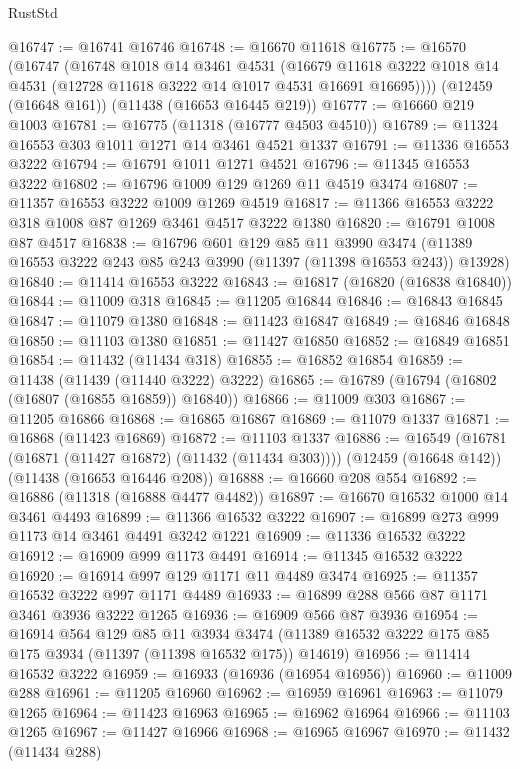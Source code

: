 \begin{lexlean}{RustStd}
\begin{coremodule}
@16747 := @16741 @16746
@16748 := @16670 @11618
@16775 := @16570
    (@16747
      (@16748
        @1018
        @14
        @3461
        @4531
        (@16679 @11618 @3222 @1018 @14 @4531 (@12728 @11618 @3222 @14 @1017 @4531 @16691 @16695))))
    (@12459 (@16648 @161))
    (@11438 (@16653 @16445 @219))
@16777 := @16660 @219 @1003
@16781 := @16775 (@11318 (@16777 @4503 @4510))
@16789 := @11324 @16553 @303 @1011 @1271 @14 @3461 @4521 @1337
@16791 := @11336 @16553 @3222
@16794 := @16791 @1011 @1271 @4521
@16796 := @11345 @16553 @3222
@16802 := @16796 @1009 @129 @1269 @11 @4519 @3474
@16807 := @11357 @16553 @3222 @1009 @1269 @4519
@16817 := @11366 @16553 @3222 @318 @1008 @87 @1269 @3461 @4517 @3222 @1380
@16820 := @16791 @1008 @87 @4517
@16838 := @16796
    @601
    @129
    @85
    @11
    @3990
    @3474
    (@11389 @16553 @3222 @243 @85 @243 @3990 (@11397 (@11398 @16553 @243)) @13928)
@16840 := @11414 @16553 @3222
@16843 := @16817 (@16820 (@16838 @16840))
@16844 := @11009 @318
@16845 := @11205 @16844
@16846 := @16843 @16845
@16847 := @11079 @1380
@16848 := @11423 @16847
@16849 := @16846 @16848
@16850 := @11103 @1380
@16851 := @11427 @16850
@16852 := @16849 @16851
@16854 := @11432 (@11434 @318)
@16855 := @16852 @16854
@16859 := @11438 (@11439 (@11440 @3222) @3222)
@16865 := @16789 (@16794 (@16802 (@16807 (@16855 @16859)) @16840))
@16866 := @11009 @303
@16867 := @11205 @16866
@16868 := @16865 @16867
@16869 := @11079 @1337
@16871 := @16868 (@11423 @16869)
@16872 := @11103 @1337
@16886 := @16549
    (@16781 (@16871 (@11427 @16872) (@11432 (@11434 @303))))
    (@12459 (@16648 @142))
    (@11438 (@16653 @16446 @208))
@16888 := @16660 @208 @554
@16892 := @16886 (@11318 (@16888 @4477 @4482))
@16897 := @16670 @16532 @1000 @14 @3461 @4493
@16899 := @11366 @16532 @3222
@16907 := @16899 @273 @999 @1173 @14 @3461 @4491 @3242 @1221
@16909 := @11336 @16532 @3222
@16912 := @16909 @999 @1173 @4491
@16914 := @11345 @16532 @3222
@16920 := @16914 @997 @129 @1171 @11 @4489 @3474
@16925 := @11357 @16532 @3222 @997 @1171 @4489
@16933 := @16899 @288 @566 @87 @1171 @3461 @3936 @3222 @1265
@16936 := @16909 @566 @87 @3936
@16954 := @16914
    @564
    @129
    @85
    @11
    @3934
    @3474
    (@11389 @16532 @3222 @175 @85 @175 @3934 (@11397 (@11398 @16532 @175)) @14619)
@16956 := @11414 @16532 @3222
@16959 := @16933 (@16936 (@16954 @16956))
@16960 := @11009 @288
@16961 := @11205 @16960
@16962 := @16959 @16961
@16963 := @11079 @1265
@16964 := @11423 @16963
@16965 := @16962 @16964
@16966 := @11103 @1265
@16967 := @11427 @16966
@16968 := @16965 @16967
@16970 := @11432 (@11434 @288)

\end{coremodule}
\end{lexlean}
